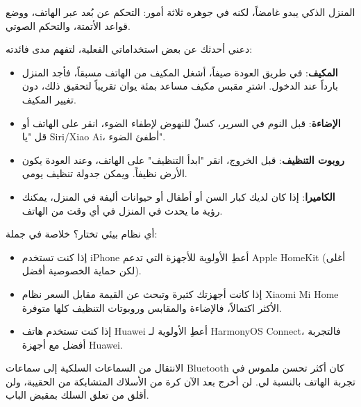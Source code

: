 
المنزل الذكي يبدو غامضاً، لكنه في جوهره ثلاثة أمور: التحكم عن بُعد عبر الهاتف، ووضع قواعد الأتمتة، والتحكم الصوتي.

دعني أحدثك عن بعض استخداماتي الفعلية، لتفهم مدى فائدته:

\begin{itemize}
  \item \textbf{المكيف}: في طريق العودة صيفاً، أشغل المكيف من الهاتف مسبقاً، فأجد المنزل بارداً عند الدخول. اشترِ مقبس مكيف مساعد بمئة يوان تقريباً لتحقيق ذلك، دون تغيير المكيف.
  \item \textbf{الإضاءة}: قبل النوم في السرير، كسلٌ للنهوض لإطفاء الضوء، انقر على الهاتف أو قل "يا Siri/Xiao Ai، أطفئ الضوء".
  \item \textbf{روبوت التنظيف}: قبل الخروج، انقر "ابدأ التنظيف" على الهاتف، وعند العودة يكون الأرض نظيفاً. ويمكن جدولة تنظيف يومي.
  \item \textbf{الكاميرا}: إذا كان لديك كبار السن أو أطفال أو حيوانات أليفة في المنزل، يمكنك رؤية ما يحدث في المنزل في أي وقت من الهاتف.
\end{itemize}

أي نظام بيئي تختار؟ خلاصة في جملة:

\begin{itemize}
  \item إذا كنت تستخدم iPhone أعطِ الأولوية للأجهزة التي تدعم Apple HomeKit (أغلى لكن حماية الخصوصية أفضل).
  \item إذا كانت أجهزتك كثيرة وتبحث عن القيمة مقابل السعر نظام Xiaomi Mi Home الأكثر اكتمالاً، فالإضاءة والمقابس وروبوتات التنظيف كلها متوفرة.
  \item إذا كنت تستخدم هاتف Huawei أعطِ الأولوية لـ HarmonyOS Connect، فالتجربة أفضل مع أجهزة Huawei.
\end{itemize}


الانتقال من السماعات السلكية إلى سماعات Bluetooth كان أكثر تحسن ملموس في تجربة الهاتف بالنسبة لي. لن أخرج بعد الآن كرة من الأسلاك المتشابكة من الحقيبة، ولن أقلق من تعلق السلك بمقبض الباب.

